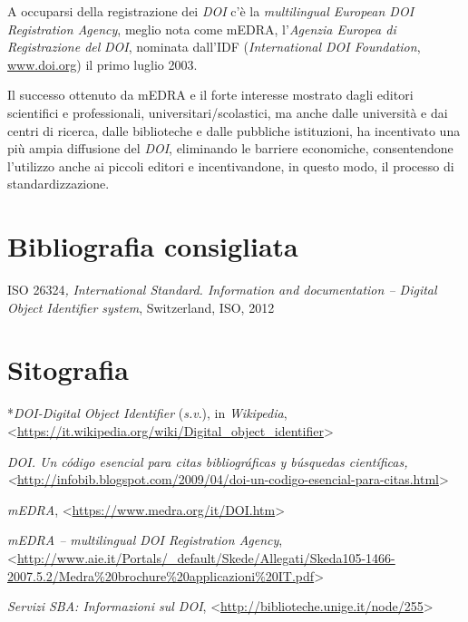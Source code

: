 \documentclass[
  b5paper,
  twoside,
  11pt,
  chapterprefix=false,
  bibliography=totocnumbered,
  parskip=0]{scrbook}
\begin{document}
A occuparsi della registrazione dei \emph{DOI} c'è la \emph{multilingual European
DOI Registration Agency}, meglio nota come mEDRA, l'\emph{Agenzia Europea di
Registrazione del} \emph{DOI}, nominata dall'IDF (\emph{International DOI
Foundation}, \href{http://www.doi.org/}{{www.doi.org}}) il primo
luglio 2003.

Il successo ottenuto da mEDRA e il forte interesse mostrato dagli
editori scientifici e professionali, universitari/scolastici, ma anche
dalle università e dai centri di ricerca, dalle biblioteche e dalle
pubbliche istituzioni, ha incentivato una più ampia diffusione del
\emph{DOI}, eliminando le barriere economiche, consentendone l'utilizzo anche
ai piccoli editori e incentivandone, in questo modo, il processo di
standardizzazione.

\hypertarget{bibliografia-consigliata-7}{%
\section*{Bibliografia consigliata}\label{bibliografia-consigliata-7}}

ISO 26324\emph{,} \emph{International Standard. Information and documentation --
Digital Object Identifier system}, Switzerland, ISO, 2012

\hypertarget{sitografia-9}{%
\section*{Sitografia}\label{sitografia-9}}

*\emph{DOI-Digital Object Identifier} (\emph{s.v}.), in \emph{Wikipedia},
\textless{}{\url{https://it.wikipedia.org/wiki/Digital_object_identifier}\textgreater{}}

\emph{DOI. Un código esencial para citas bibliográficas y búsquedas
científicas,
\textless{}}{\url{http://infobib.blogspot.com/2009/04/doi-un-codigo-esencial-para-citas.html}\textgreater{}}

\emph{mEDRA}, \textless{}{\url{https://www.medra.org/it/DOI.htm}\textgreater{}}

\emph{mEDRA -- multilingual DOI Registration Agency},
\textless{}{\url{http://www.aie.it/Portals/_default/Skede/Allegati/Skeda105-1466-2007.5.2/Medra\%20brochure\%20applicazioni\%20IT.pdf}\textgreater{}}

\emph{Servizi SBA: Informazioni sul DOI},
\textless{}{\url{http://biblioteche.unige.it/node/255}\textgreater{}}
\end{document}
